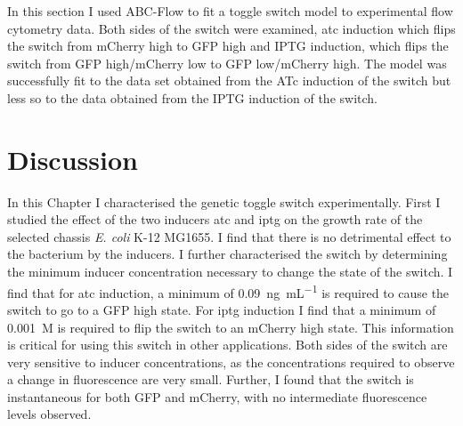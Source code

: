 
In this section I used ABC-Flow to fit a toggle switch model to experimental flow cytometry data. Both sides of the switch were examined, \acrshort{atc} induction which flips the switch from mCherry high to GFP high and IPTG induction, which flips the switch from GFP high/mCherry low to GFP low/mCherry high. The model was successfully fit to the data set obtained from the ATc induction of the switch but less so to the data obtained from the IPTG induction of the switch. 
\section{Discussion}

In this Chapter I characterised the genetic toggle switch experimentally. First I studied the effect of the two inducers \acrshort{atc} and \acrshort{iptg} on the growth rate of the selected chassis \textit{E. coli} K-12 MG1655. I find that there is no detrimental effect to the bacterium by the inducers. I further characterised the switch by determining the minimum inducer concentration necessary to change the state of the switch. I find that for \acrshort{atc} induction, a minimum of \SI{0.09}{\nano\gram\per\milli\liter} is required to cause the switch to go to a GFP high state. For \acrshort{iptg} induction I find that a minimum of \SI{0.001}{M} is required to flip the switch to an mCherry high state. This information is critical for using this switch in other applications. Both sides of the switch are very sensitive to inducer concentrations, as the concentrations required to observe a change in fluorescence are very small. Further, I found that the switch is instantaneous for both GFP and mCherry, with no intermediate fluorescence levels observed. 

